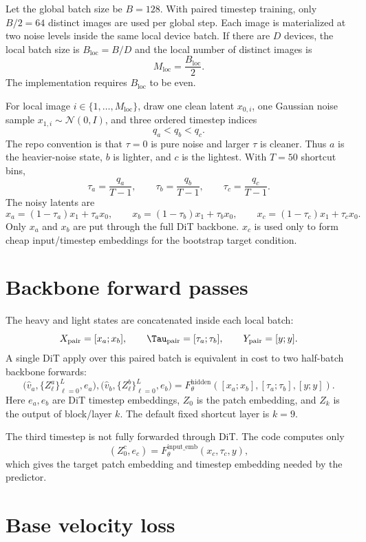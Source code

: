 \documentclass[11pt]{article}
\begin{document}
Let the global batch size be $B=128$. With paired timestep training, only
$B/2=64$ distinct images are used per global step. Each image is materialized at
two noise levels inside the same local device batch. If there are $D$ devices,
the local batch size is $B_{\mathrm{loc}}=B/D$ and the local number of distinct
images is
\[
  M_{\mathrm{loc}} = \frac{B_{\mathrm{loc}}}{2}.
\]
The implementation requires $B_{\mathrm{loc}}$ to be even.

For local image $i\in\{1,\ldots,M_{\mathrm{loc}}\}$, draw one clean latent
$x_{0,i}$, one Gaussian noise sample $x_{1,i}\sim\mathcal{N}(0,I)$, and three
ordered timestep indices
\[
  q_a < q_b < q_c.
\]
The repo convention is that $\tau=0$ is pure noise and larger $\tau$ is cleaner.
Thus $a$ is the heavier-noise state, $b$ is lighter, and $c$ is the lightest.
With $T=50$ shortcut bins,
\[
  \tau_a=\frac{q_a}{T-1},\qquad
  \tau_b=\frac{q_b}{T-1},\qquad
  \tau_c=\frac{q_c}{T-1}.
\]
The noisy latents are
\[
  x_a=(1-\tau_a)x_1+\tau_a x_0,\qquad
  x_b=(1-\tau_b)x_1+\tau_b x_0,\qquad
  x_c=(1-\tau_c)x_1+\tau_c x_0.
\]
Only $x_a$ and $x_b$ are put through the full DiT backbone. $x_c$ is used only
to form cheap input/timestep embeddings for the bootstrap target condition.

\section{Backbone forward passes}

The heavy and light states are concatenated inside each local batch:
\[
  X_{\mathrm{pair}} = [x_a; x_b],\qquad
  \Tau_{\mathrm{pair}} = [\tau_a; \tau_b],\qquad
  Y_{\mathrm{pair}}=[y;y].
\]
A single DiT apply over this paired batch is equivalent in cost to two half-batch
backbone forwards:
\[
  \bigl(\hat v_a,\{Z_\ell^a\}_{\ell=0}^{L},e_a\bigr),
  \bigl(\hat v_b,\{Z_\ell^b\}_{\ell=0}^{L},e_b\bigr)
  =
  F_\theta^{\mathrm{hidden}}([x_a;x_b],[\tau_a;\tau_b],[y;y]).
\]
Here $e_a,e_b$ are DiT timestep embeddings, $Z_0$ is the patch embedding, and
$Z_k$ is the output of block/layer $k$. The default fixed shortcut layer is
$k=9$.

The third timestep is not fully forwarded through DiT. The code computes only
\[
  (Z_0^c,e_c)=F_\theta^{\mathrm{input\_emb}}(x_c,\tau_c,y),
\]
which gives the target patch embedding and timestep embedding needed by the
predictor.

\section{Base velocity loss}
\end{document}
